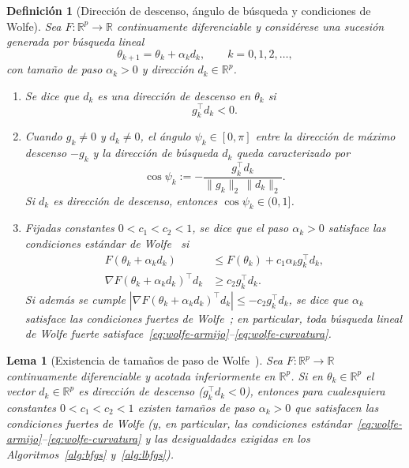 \documentclass[a4paper,openany,oneside,10pt]{report}
\theoremstyle{pnlTeorema}
\newtheorem{lema}{Lema}[section]
\theoremstyle{pnlDefinicion}
\newtheorem{definicion}{Definición}[section]
\theoremstyle{pnlObservacion}
\begin{document}
\begin{definicion}[Dirección de descenso, ángulo de búsqueda y condiciones de Wolfe]
\label{def:lbfgs-wolfe}
Sea $F:\mathbb{R}^p\to\mathbb{R}$ continuamente diferenciable y considérese una
sucesión generada por búsqueda lineal
\begin{equation}\label{eq:iteracion-busqueda-lineal}
\theta_{k+1}=\theta_k+\alpha_k d_k,\qquad k=0,1,2,\ldots,
\end{equation}
con tamaño de paso $\alpha_k>0$ y dirección $d_k\in\mathbb{R}^p$.
\begin{enumerate}
\item Se dice que $d_k$ es una \emph{dirección de descenso} en $\theta_k$ si
\begin{equation}\label{eq:condicion-descenso}
g_k^\top d_k < 0.
\end{equation}
\item Cuando $g_k\neq 0$ y $d_k\neq 0$, el ángulo $\psi_k\in[0,\pi]$ entre la
dirección de máximo descenso $-g_k$ y la dirección de búsqueda $d_k$ queda
caracterizado por
\begin{equation}\label{eq:coseno-angulo}
\cos\psi_k := -\frac{g_k^\top d_k}{\|g_k\|_2\,\|d_k\|_2}.
\end{equation}
Si $d_k$ es dirección de descenso, entonces $\cos\psi_k\in(0,1]$.
\item Fijadas constantes $0<c_1<c_2<1$, se dice que el paso $\alpha_k>0$
satisface las \emph{condiciones estándar de Wolfe}~\cite[ecs.~(3.4)--(3.5), p.~89]{andrei2020} si
\begin{align}
F(\theta_k+\alpha_k d_k) &\le F(\theta_k)+c_1\alpha_k g_k^\top d_k,
\label{eq:wolfe-armijo}\\
\nabla F(\theta_k+\alpha_k d_k)^\top d_k &\ge c_2 g_k^\top d_k.
\label{eq:wolfe-curvatura}
\end{align}
Si además se cumple
$|\nabla F(\theta_k+\alpha_k d_k)^\top d_k|\le -c_2 g_k^\top d_k$, se dice que
$\alpha_k$ satisface las \emph{condiciones fuertes de Wolfe}~\cite[ec.~(3.6), p.~89]{andrei2020};
en particular, toda búsqueda lineal de Wolfe fuerte satisface~\eqref{eq:wolfe-armijo}--\eqref{eq:wolfe-curvatura}.
\end{enumerate}
\end{definicion}

\begin{lema}[Existencia de tamaños de paso de Wolfe~\cite{nocedalWright2006}]
\label{lem:existencia-wolfe}
Sea $F:\mathbb{R}^p\to\mathbb{R}$ continuamente diferenciable y acotada inferiormente en $\mathbb{R}^p$. Si en $\theta_k\in\mathbb{R}^p$ el vector $d_k\in\mathbb{R}^p$ es dirección de descenso ($g_k^\top d_k<0$), entonces para cualesquiera constantes $0<c_1<c_2<1$ existen tamaños de paso $\alpha_k>0$ que satisfacen las condiciones fuertes de Wolfe (y, en particular, las condiciones estándar~\eqref{eq:wolfe-armijo}--\eqref{eq:wolfe-curvatura} y las desigualdades exigidas en los Algoritmos~\ref{alg:bfgs} y~\ref{alg:lbfgs}).
\end{lema}
\end{document}
